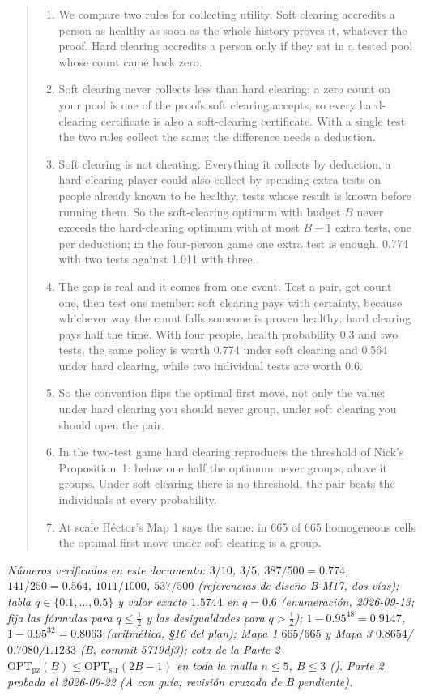 \documentclass[11pt]{article}
\theoremstyle{remark}
\newcommand{\pz}{\mathrm{pz}}
\newcommand{\str}{\mathrm{str}}
\newcommand{\OPT}{\mathrm{OPT}}
\begin{document}
\begin{quote}\small
\begin{enumerate}
\item We compare two rules for collecting utility. Soft clearing accredits a person as healthy as soon as the whole history proves it, whatever the proof. Hard clearing accredits a person only if they sat in a tested pool whose count came back zero.
\item Soft clearing never collects less than hard clearing: a zero count on your pool is one of the proofs soft clearing accepts, so every hard-clearing certificate is also a soft-clearing certificate. With a single test the two rules collect the same; the difference needs a deduction.
\item Soft clearing is not cheating. Everything it collects by deduction, a hard-clearing player could also collect by spending extra tests on people already known to be healthy, tests whose result is known before running them. So the soft-clearing optimum with budget $B$ never exceeds the hard-clearing optimum with at most $B-1$ extra tests, one per deduction; in the four-person game one extra test is enough, 0.774 with two tests against 1.011 with three.
\item The gap is real and it comes from one event. Test a pair, get count one, then test one member: soft clearing pays with certainty, because whichever way the count falls someone is proven healthy; hard clearing pays half the time. With four people, health probability 0.3 and two tests, the same policy is worth 0.774 under soft clearing and 0.564 under hard clearing, while two individual tests are worth 0.6.
\item So the convention flips the optimal first move, not only the value: under hard clearing you should never group, under soft clearing you should open the pair.
\item In the two-test game hard clearing reproduces the threshold of Nick's Proposition~1: below one half the optimum never groups, above it groups. Under soft clearing there is no threshold, the pair beats the individuals at every probability.
\item At scale Héctor's Map 1 says the same: in 665 of 665 homogeneous cells the optimal first move under soft clearing is a group.
\end{enumerate}
\end{quote}

\medskip\noindent\textit{Números verificados en este documento: $3/10$, $3/5$, $387/500=0.774$, $141/250=0.564$, $1011/1000$, $537/500$ (referencias de diseño B-M17, dos vías); tabla $q\in\{0.1,\dots,0.5\}$ y valor exacto $1.5744$ en $q=0.6$ (enumeración, 2026-09-13;  fija las fórmulas para $q\le\tfrac12$ y las desigualdades para $q>\tfrac12$); $1-0.95^{48}=0.9147$, $1-0.95^{32}=0.8063$ (aritmética, §16 del plan); Mapa 1 $665/665$ y Mapa 3 $0.8654$/$0.7080$/$1.1233$ (B, commit 5719df3); cota de la Parte 2 $\OPT_\pz(B)\le\OPT_\str(2B-1)$ en toda la malla $n\le5$, $B\le3$ (). Parte 2 probada el 2026-09-22 (A con guía; revisión cruzada de B pendiente).}
\end{document}
